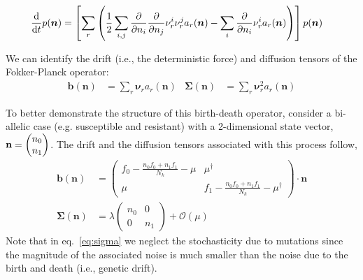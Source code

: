 \documentclass[11pt]{article}
\renewcommand{\d}{{\text d}}
\begin{document}
\begin{align}
    \frac{\d}{\d t}{p}(\bm{n}) &= 
    \left[ \sum_r \left( \frac{1}{2}\sum_{i,j} \frac{\partial}{\partial n_i} \frac{\partial}{\partial n_j}   \nu^{i}_r \nu^{j}_r a_r(\bm{n}) -\sum_i\frac{\partial}{\partial n_i}   \nu^{i}_r a_{r}(\bm{n})  \right) \right]  p(\bm{n})
\end{align}

We can  identify the drift (i.e., the deterministic force) and diffusion tensors of the Fokker-Planck operator:
\begin{align}
 \bm{b}(\bm{n}) &= \sum_r \bm{\nu}_r a_r(\bm{n}) &  \bm{\Sigma}(\bm{n}) &= \sum_r \bm{\nu}_r^2 a_r (\bm{n})
\end{align}




To better demonstrate the structure of this birth-death operator,  consider a bi-allelic case (e.g. susceptible and resistant) with a 2-dimensional state vector, $\bf n =  \begin{pmatrix} n_0 \\
n_1 \end{pmatrix}$. The drift and the diffusion tensors associated with this process follow, 
\begin{align}
\bm{b}(\bm{n}) &= \begin{pmatrix} f_0 - \frac{n_0 f_0 + n_1 f_1}{N_k} - \mu & \mu^\dagger \\ \mu &  f_1 - \frac{n_0 f_0 + n_1 f_1}{N_k} - \mu^\dagger \end{pmatrix} \cdot  \bm{n} \\
\label{eq:sigma}\bm{\Sigma}(\bm{n}) &= \lambda \begin{pmatrix} n_0 & 0\\ 0&n_1\end{pmatrix} +\mathcal O(\mu)
\end{align}
Note that in eq.~\ref{eq:sigma} we neglect the stochasticity  due to mutations since the magnitude of the associated noise is much smaller than the noise due to the birth and death (i.e., genetic drift). 
\end{document}
